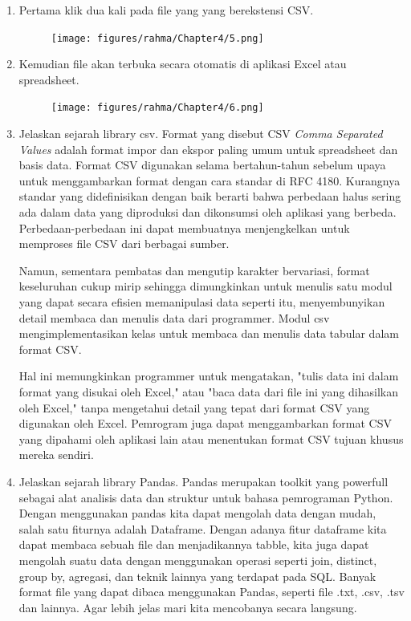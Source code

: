 \begin{enumerate}
	\item Pertama klik dua kali pada file yang yang berekstensi CSV.
        		\begin{figure}[H]	\texttt{[image: figures/rahma/Chapter4/5.png]}
           		\centering
        		\end{figure}
          \item Kemudian file akan terbuka secara otomatis di aplikasi Excel atau spreadsheet.
	           \begin{figure}[H] \texttt{[image: figures/rahma/Chapter4/6.png]}
           		\centering
        		\end{figure}
	\item Jelaskan sejarah library csv.
Format yang disebut CSV \textit{Comma Separated Values} adalah format impor dan ekspor paling umum untuk spreadsheet dan basis data. Format CSV digunakan selama bertahun-tahun sebelum upaya untuk menggambarkan format dengan cara standar di RFC 4180. Kurangnya standar yang didefinisikan dengan baik berarti bahwa perbedaan halus sering ada dalam data yang diproduksi dan dikonsumsi oleh aplikasi yang berbeda. Perbedaan-perbedaan ini dapat membuatnya menjengkelkan untuk memproses file CSV dari berbagai sumber.
   
Namun, sementara pembatas dan mengutip karakter bervariasi, format keseluruhan cukup mirip sehingga dimungkinkan untuk menulis satu modul yang dapat secara efisien memanipulasi data seperti itu, menyembunyikan detail membaca dan menulis data dari programmer. Modul csv mengimplementasikan kelas untuk membaca dan menulis data tabular dalam format CSV.
   
Hal ini memungkinkan programmer untuk mengatakan, "tulis data ini dalam format yang disukai oleh Excel," atau "baca data dari file ini yang dihasilkan oleh Excel," tanpa mengetahui detail yang tepat dari format CSV yang digunakan oleh Excel. Pemrogram juga dapat menggambarkan format CSV yang dipahami oleh aplikasi lain atau menentukan format CSV tujuan khusus mereka sendiri.
   
	\item Jelaskan sejarah library Pandas.
   Pandas merupakan toolkit yang powerfull sebagai alat analisis data dan struktur untuk bahasa pemrograman Python. Dengan menggunakan pandas kita dapat mengolah data dengan mudah, salah satu fiturnya adalah Dataframe. Dengan adanya fitur dataframe kita dapat membaca sebuah file dan menjadikannya tabble, kita juga dapat mengolah suatu data dengan menggunakan operasi seperti join, distinct, group by, agregasi, dan teknik lainnya yang terdapat pada SQL. Banyak format file yang dapat dibaca menggunakan Pandas, seperti file .txt, .csv, .tsv dan lainnya. Agar lebih jelas mari kita mencobanya secara langsung.
   

\end{enumerate}

